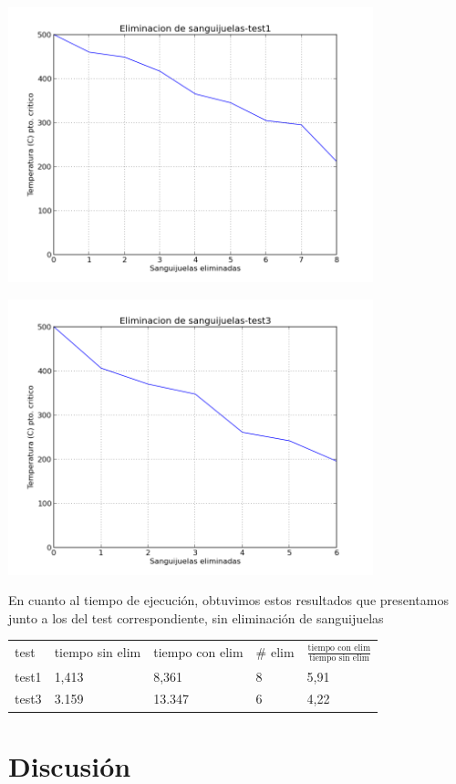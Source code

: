 \documentclass[spanish,a4paper]{article}
\begin{document}
\includegraphics[width=300pt]{elim1.png} 

\includegraphics[width=300pt]{elim3.png} 

En cuanto al tiempo de ejecución, obtuvimos estos resultados que presentamos junto a los del test correspondiente, sin eliminación de sanguijuelas
\begin{tabular}{ l l l l l}
  test & tiempo sin elim & tiempo con elim & $\#$ elim & $\frac{\text{tiempo con elim}}{\text{tiempo sin elim}}$\\
  test1 & 1,413 & 8,361 & 8 & 5,91\\
  test3 & 3.159 & 13.347 & 6 & 4,22\\
\end{tabular} 


\newpage

\section{Discusi\'{o}n}
\label{sec:discusion}
\end{document}

